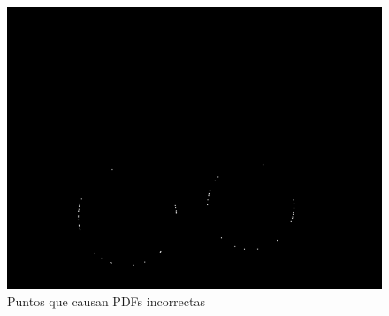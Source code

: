 \documentclass[10pt,oneside,a4paper]{article}
\begin{document}
\begin{figure}[!htb]
\centering
\includegraphics[width=.6\linewidth]{images/pdfs_incorrectas.png}
\caption{Puntos que causan PDFs incorrectas}
\label{fig:disp}
\end{figure}

\subsection{}
  
\end{document}
